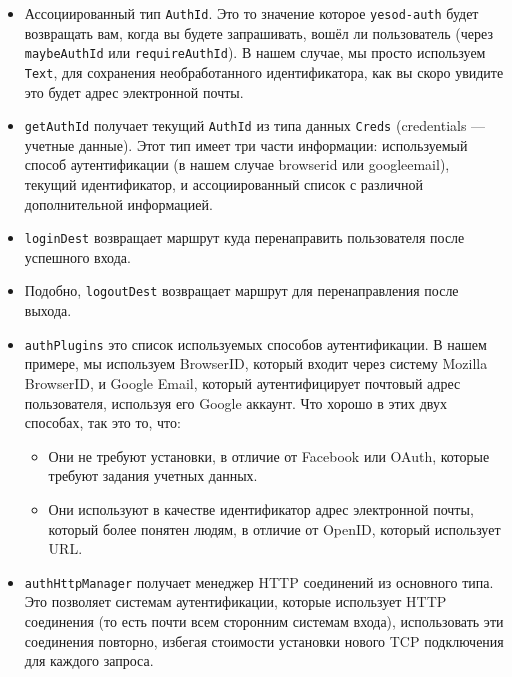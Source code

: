\begin{itemize}
    \item Ассоциированный тип \lstinline'AuthId'. Это то значение которое \lstinline'yesod-auth' будет возвращать вам, когда вы будете запрашивать, вошёл ли пользователь (через \lstinline'maybeAuthId' или \lstinline'requireAuthId'). В нашем случае, мы просто используем \lstinline'Text', для сохранения необработанного идентификатора, как вы скоро увидите это будет адрес электронной почты. 

    \item \lstinline'getAuthId' получает текущий \lstinline'AuthId' из типа данных \lstinline'Creds' (credentials --- учетные данные). Этот тип имеет три части информации: используемый способ аутентификации (в нашем случае browserid или googleemail), текущий идентификатор, и ассоциированный список с различной дополнительной информацией.

    \item \lstinline'loginDest' возвращает маршрут куда перенаправить пользователя после успешного входа.

    \item Подобно, \lstinline'logoutDest' возвращает маршрут для перенаправления после выхода. 

    \item \lstinline'authPlugins' это список используемых способов аутентификации. В нашем примере, мы используем BrowserID, который входит через систему Mozilla BrowserID, и Google Email, который аутентифицирует почтовый адрес пользователя, используя его Google аккаунт. Что хорошо в этих двух способах, так это то, что:
    
    \begin{itemize}
        \item Они не требуют установки, в отличие от Facebook или OAuth, которые требуют задания учетных данных.
        
        \item Они используют в качестве идентификатор адрес электронной почты, который более понятен людям, в отличие от OpenID, который использует URL. 
    \end{itemize}
    
    \item \lstinline'authHttpManager' получает менеджер HTTP соединений из основного типа. Это позволяет системам аутентификации, которые использует HTTP соединения (то есть почти всем сторонним системам входа), использовать эти соединения повторно, избегая стоимости установки нового TCP подключения для каждого запроса.
\end{itemize}

